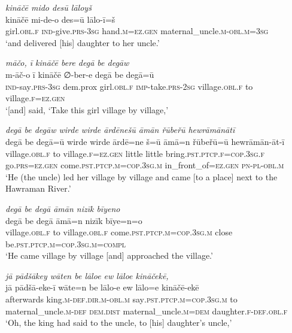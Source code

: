 \ea \label{ZP.38}
\textit{kināčē mido desū lāloyš} \\ 
\gll kināčē mi-de-o des=ū lālo-ī=š \\ 
 girl\textsc{.obl}\textsc{.f} \textsc{ind-}give\textsc{.prs}\textsc{-3sg} hand\textsc{.m}\textsc{\textsc{=ez.gen}} maternal\_uncle\textsc{.m}\textsc{-obl}\textsc{.m}\textsc{=3sg} \\ 
\glt `and delivered [his] daughter to her uncle.'
\z 
 
\ea \label{ZP.39}
\textit{māčo, ī kināčē bere degā be degāw} \\ 
\gll m-āč-o ī kināčē ∅-ber-e degā be degā=ū \\ 
 \textsc{ind-}say\textsc{.prs}\textsc{-3sg} dem.prox girl\textsc{.obl}\textsc{.f} \textsc{imp-}take\textsc{.prs}-\textsc{2sg} village\textsc{.obl}\textsc{.f} to village\textsc{.f}\textsc{\textsc{=ez.gen}} \\ 
\glt `[and] said, ‘Take this girl village by village,'
\z 
 
\ea \label{ZP.41}
\textit{degā be degāw wirde wirde ārdēnešū āmān řūbeřū hewrāmānātī} \\ 
\gll degā be degā=ū wirde wirde ārdē=ne š=ū āmā=n řūbeřū=ū hewrāmān-āt-ī \\ 
 village\textsc{.obl}\textsc{.f} to village\textsc{.f}\textsc{\textsc{=ez.gen}} little little bring\textsc{.pst}\textsc{.ptcp}\textsc{.f}\textsc{=cop}\textsc{.3sg}\textsc{.f} go\textsc{.prs}\textsc{\textsc{=ez.gen}} come\textsc{.pst}\textsc{.ptcp}\textsc{.m}\textsc{=cop}\textsc{.3sg}\textsc{.m} in\_front\_of\textsc{\textsc{=ez.gen}} \textsc{pn}\textsc{\textsc{-pl}}\textsc{-obl}\textsc{.m} \\ 
\glt `He (the uncle) led her village by village and came [to a place] next to the Hawraman River.'
\z 
 
\ea \label{ZP.42}
\textit{degā be degā āmān nizīk bīyeno} \\ 
\gll degā be degā āmā=n nizīk bīye=n=o \\ 
 village\textsc{.obl}\textsc{.f} to village\textsc{.obl}\textsc{.f} come\textsc{.pst}\textsc{.ptcp}\textsc{.m}\textsc{=cop}\textsc{.3sg}\textsc{.m} close be\textsc{.pst}\textsc{.ptcp}\textsc{.m}\textsc{=cop}\textsc{.3sg}\textsc{.m}\textsc{=compl} \\ 
\glt `He came village by village [and] approached the village.'
\z 
 
\ea \label{ZP.43}
\textit{jā pādšākey wāten be lāloe ew lāloe kināčekē,} \\ 
\gll jā pādšā-eke-ī wāte=n be lālo-e ew lālo=e kināčē-ekē \\ 
 afterwards king\textsc{.m}\textsc{-def}\textsc{.dir}\textsc{.m}\textsc{-obl}\textsc{.m} say\textsc{.pst}\textsc{.ptcp}\textsc{.m}\textsc{=cop}\textsc{.3sg}\textsc{.m} to maternal\_uncle\textsc{.m}\textsc{-def} \textsc{dem.dist} maternal\_uncle\textsc{.m}\textsc{=dem} daughter\textsc{.f}\textsc{-def}\textsc{.obl}\textsc{.f} \\ 
\glt `Oh, the king had said to the uncle, to [his] daughter’s uncle,'
\z 
 
